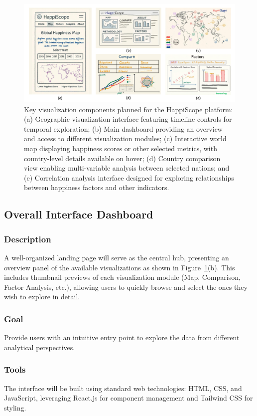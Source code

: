 \documentclass[10pt,conference,compsocconf]{IEEEtran}
\begin{document}
\begin{figure}[ht]
    \centering
    \includegraphics[width=\linewidth]{sketches.pdf}
    \caption{Key visualization components planned for the HappiScope platform: (a) Geographic visualization interface featuring timeline controls for temporal exploration; (b) Main dashboard providing an overview and access to different visualization modules; (c) Interactive world map displaying happiness scores or other selected metrics, with country-level details available on hover; (d) Country comparison view enabling multi-variable analysis between selected nations; and (e) Correlation analysis interface designed for exploring relationships between happiness factors and other indicators.}
    \label{fig:sketches}
\end{figure}

\subsection{Overall Interface Dashboard}
\subsubsection{Description}
A well-organized landing page will serve as the central hub, presenting an overview panel of the available visualizations as shown in Figure~\ref{fig:sketches}(b). This includes thumbnail previews of each visualization module (Map, Comparison, Factor Analysis, etc.), allowing users to quickly browse and select the ones they wish to explore in detail.
\subsubsection{Goal}
Provide users with an intuitive entry point to explore the data from different analytical perspectives.
\subsubsection{Tools}
The interface will be built using standard web technologies: HTML, CSS, and JavaScript, leveraging React.js for component management and Tailwind CSS for styling.
\end{document}
